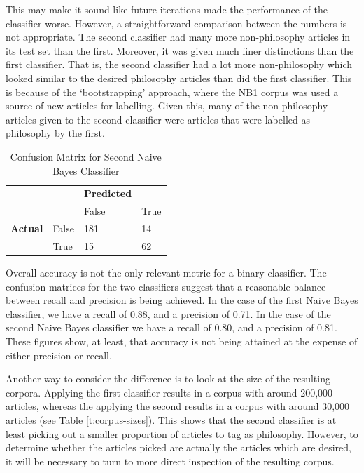 \documentclass{article}
\begin{document}
This may make it sound like future iterations made the performance of the classifier worse. However, a straightforward comparison between the numbers is not appropriate. The second classifier had many more non-philosophy articles in its test set than the first. Moreover, it was given much finer distinctions than the first classifier. That is, the second classifier had a lot more non-philosophy which looked similar to the desired philosophy articles than did the first classifier. This is because of the `bootstrapping' approach, where the NB1 corpus was used a source of new articles for labelling. Given this, many of the non-philosophy articles given to the second classifier were articles that were labelled as philosophy by the first.

\begin{table}[]
        \centering
        \footnotesize
        \begin{tabular}{ll|ll}
        & & \textbf{Predicted} & \\
        & & False & True \\
        \hline
        \textbf{Actual} & False & 181 & 14 \\
        & True & 15 & 62 \\
        \end{tabular}
        \caption{Confusion Matrix for Second Naive Bayes Classifier}
        \label{t:nb2-confusion}
\end{table}

Overall accuracy is not the only relevant metric for a binary classifier. The confusion matrices for the two classifiers suggest that a reasonable balance between recall and precision is being achieved. In the case of the first Naive Bayes classifier, we have a recall of 0.88, and a precision of 0.71. In the case of the second Naive Bayes classifier we have a recall of 0.80, and a precision of 0.81. These figures show, at least, that accuracy is not being attained at the expense of either precision or recall.

Another way to consider the difference is to look at the size of the resulting corpora. Applying the first classifier results in a corpus with around 200,000 articles, whereas the applying the second results in a corpus with around 30,000 articles (see Table \ref{t:corpus-sizes}). This shows that the second classifier is at least picking out a smaller proportion of articles to tag as philosophy. However, to determine whether the articles picked are actually the articles which are desired, it will be necessary to turn to more direct inspection of the resulting corpus.
\end{document}
